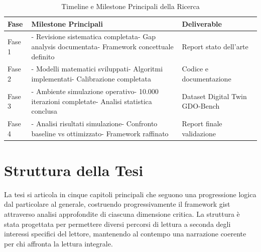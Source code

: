 \begin{table}[htbp]
\centering
 \small
 \sffamily 
\caption{Timeline e Milestone Principali della Ricerca}
\label{tab:timeline_ricerca}
\begin{tabularx}{\textwidth}{@{}lXl@{}}
\toprule
\textbf{Fase} & \textbf{Milestone Principali} & \textbf{Deliverable} \\
\midrule
Fase 1 &  - Revisione sistematica completata\newline- Gap analysis documentata\newline- Framework concettuale definito & Report stato dell'arte \\
Fase 2 & - Modelli matematici sviluppati\newline- Algoritmi implementati\newline- Calibrazione completata & Codice e documentazione \\
Fase 3 & - Ambiente simulazione operativo\newline- 10.000 iterazioni completate\newline- Analisi statistica conclusa & Dataset Digital Twin GDO-Bench \\
Fase 4 & - Analisi risultati simulazione\newline - Confronto baseline vs ottimizzato\newline - Framework raffinato & Report finale validazione \\
\bottomrule
\end{tabularx}
\end{table}

\section{Struttura della Tesi}
\label{sec:struttura_tesi}

La tesi si articola in cinque capitoli principali che seguono una progressione logica dal particolare al generale, costruendo progressivamente il framework \gls{gist} attraverso analisi approfondite di ciascuna dimensione critica. La struttura è stata progettata per permettere diversi percorsi di lettura a seconda degli interessi specifici del lettore, mantenendo al contempo una narrazione coerente per chi affronta la lettura integrale.

